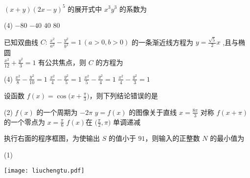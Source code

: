 \documentclass[12pt,space]{ctexart} %
\begin{document}
\begin{enumerate}[itemsep=0.2em,topsep=0pt]
\item $(x+y)(2x-y)^5$ 的展开式中 $x^3y^3$ 的系数为 
\begin{tasks}(4)
	\task $-80$ \task $-40$ \task $40$ \task $80$ 
\end{tasks}
\item 已知双曲线 $C\colon\,\tfrac{x^2}{a^2}-\tfrac{y^2}{b^2}=1\,(a>0,b>0)$ 的一条渐近线方程为 $y=\tfrac{\sqrt{5}}{2}x$ ,且与椭圆\\
 $\tfrac{x^2}{12}+\tfrac{y^2}{3}=1$ 有公共焦点，则 $C$ 的方程为
\begin{tasks}(4)
	\task $\frac{x^2}{8}-\frac{y^2}{10}=1$ \task $\frac{x^2}{4}-\frac{y^2}{5}=1$ \task $\frac{x^2}{5}-\frac{y^2}{4}=1$ \task $\frac{x^2}{4}-\frac{y^2}{3}=1$ 
\end{tasks}
\item 设函数 $f(x)=\cos\big(x+\tfrac{\pi}{3}\big)$，则下列结论错误的是
\begin{tasks}(2)
\task $f(x)$ 的一个周期为 $-2\pi$ \task $y=f(x)$ 的图像关于直线 $x=\frac{8\pi}{3}$ 对称
\task $f(x+\pi)$ 的一个零点为 $x=\frac{\pi}{6}$ \task  $f(x)$在 $\Big(\frac{\pi}{2},\pi\Big)$ 单调递减 
\end{tasks}
\begin{minipage}[h][20ex][t]{.5\textwidth}\item 执行右面的程序框图，为使输出 $S$ 的值小于 $91$，则输入的正整数 $N$ 的最小值为
\begin{tasks}(1)
	    
\end{tasks}\end{minipage}
\begin{minipage}[h][20ex][t]{.45\textwidth}
\texttt{[image: liuchengtu.pdf]}
\end{minipage}\vspace{8em}


\end{enumerate}
\end{document}
